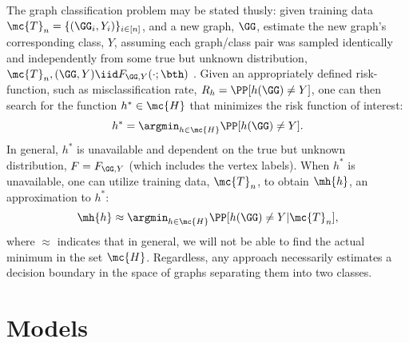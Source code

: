 \documentclass[10pt,journal,cspaper,compsoc]{IEEEtran}
\begin{document}
The graph classification problem may be stated thusly: given training data $\mc{T}_n=\{(\GG_i,Y_i)\}_{i \in [n]}$, and a new graph, $\GG$, estimate the new graph's corresponding class, $Y$, assuming each graph/class pair was sampled identically and independently from some true but unknown distribution, $\mc{T}_n,(\GG,Y) \iid F_{\GG,Y}(\cdot; \bth)$ .  Given an appropriately defined risk-function, such as misclassification rate, $R_h=\PP[h(\GG) \neq Y]$, one can then search for the function $h^* \in \mc{H}$ that minimizes the risk function of interest:
\begin{align}
	h^* = \argmin_{h \in \mc{H}} \PP[h(\GG) \neq Y].
\end{align}
In general, $h^*$ is unavailable and dependent on the true but unknown distribution,  $F=F_{\GG,Y}$ (which includes the vertex labels).  When $h^*$ is unavailable, one can utilize training data, $\mc{T}_n$, to obtain $\mh{h}$, an approximation to $h^*$:
\begin{align}
	\mh{h} \approx \argmin_{h \in \mc{H}} \PP[h(\GG) \neq Y | \mc{T}_n],
\end{align}
where $\approx$ indicates that in general, we will not be able to find the actual minimum in the set $\mc{H}$. Regardless, any approach necessarily estimates a decision boundary in the space of graphs separating them into two classes.  %




\section{Models}
\end{document}
